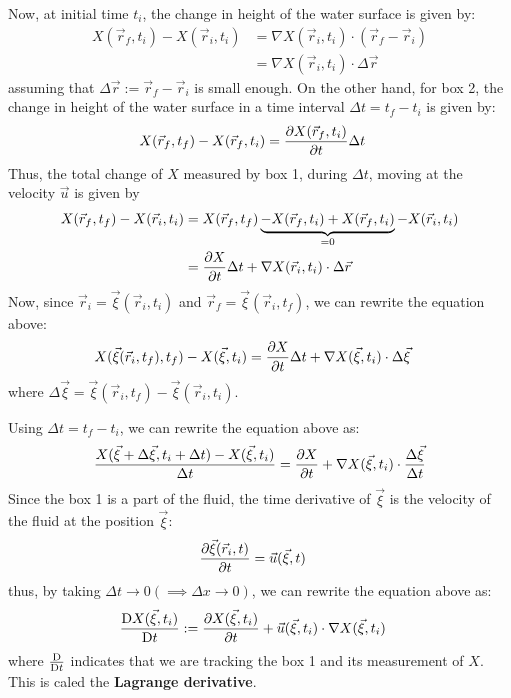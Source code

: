 Now, at initial time $t_i$, the change in height of the water surface is given by:
\begin{align}
  X(\vec{r}_f, t_i) - X(\vec{r}_i, t_i) & = \nabla X(\vec{r}_i, t_i) \cdot (\vec{r}_f - \vec{r}_i) \\
                                        & = \nabla X(\vec{r}_i, t_i) \cdot \Delta \vec{r}
\end{align}
assuming that $\Delta \vec{r} := \vec{r}_f - \vec{r}_i$ is small enough.
On the other hand, for box 2, the change in height of the water surface in a time interval $\Delta t = t_f - t_i$ is given by:
\begin{align}
  X(\vec{r}_f, t_f) - X(\vec{r}_f, t_i) & = \pdv{X(\vec{r}_f, t_i)}{t} \Delta t
\end{align}
Thus, the total change of $X$ measured by box 1, during $\Delta t$, moving at the velocity $\vec{u}$ is given by
\begin{align}
  X(\vec{r}_f, t_f) - X(\vec{r}_i, t_i)
   & = X(\vec{r}_f, t_f) \underbrace{
    - X(\vec{r}_f, t_i)
    + X(\vec{r}_f, t_i)
  }_{=0} - X(\vec{r}_i, t_i)                                               \\
   & = \pdv{X}{t} \Delta t + \nabla X(\vec{r}_i, t_i) \cdot \Delta \vec{r}
\end{align}
Now, since $\vec{r}_i = \vec{\xi}(\vec{r}_i, t_i)$ and $\vec{r}_f = \vec{\xi}(\vec{r}_i, t_f)$, we can rewrite the equation above:
\begin{align}
  X(\vec{\xi}(\vec{r}_i, t_f), t_f) - X(\vec{\xi}, t_i) & = \pdv{X}{t} \Delta t + \nabla X(\vec{\xi}, t_i) \cdot \Delta \vec{\xi}
\end{align}
where $\Delta \vec{\xi} = \vec{\xi}(\vec{r}_i, t_f) - \vec{\xi}(\vec{r}_i, t_i)$.

Using $\Delta t = t_f - t_i$, we can rewrite the equation above as:
\begin{align}
  \frac{X(\vec{\xi} + \Delta \vec{\xi}, t_i + \Delta t) - X(\vec{\xi}, t_i)}{\Delta t}
   & = \pdv{X}{t} + \nabla X(\vec{\xi}, t_i) \cdot \frac{\Delta \vec{\xi}}{\Delta t} \\
\end{align}
Since the box 1 is a part of the fluid, the time derivative of $\vec{\xi}$ is the velocity of the fluid at the position $\vec{\xi}$:
\begin{align}
  \pdv{\vec{\xi}(\vec{r}_i, t)}{t} & = \vec{u}(\vec{\xi}, t)
\end{align}
thus, by taking $\Delta t \to 0 (\implies \Delta x \to 0)$, we can rewrite the equation above as:
\begin{align}
  \mdv{X(\vec{\xi}, t_i)}{t} & := \pdv{X(\vec{\xi}, t_i)}{t} + \vec{u}(\vec{\xi}, t_i) \cdot  \nabla X(\vec{\xi}, t_i)
\end{align}
where $\mdv{}{t}$ indicates that we are tracking the box 1 and its measurement of $X$.
This is caled the \textbf{Lagrange derivative}.

